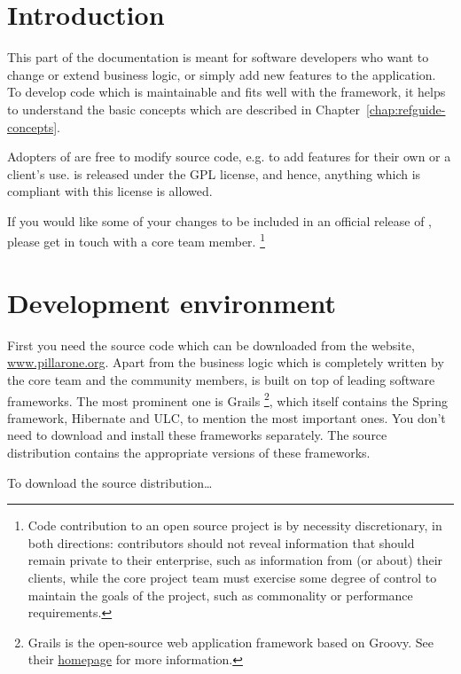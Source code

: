 \chapter{Introduction}
\label{chap:devguide-introduction}

This part of the \RA{} documentation is meant for software developers who want to change or
extend business logic, or simply add new features to the \RA{} application. To develop code
which is maintainable and fits well with the \PO{} framework, it helps to understand the
basic concepts which are described in Chapter~\ref{chap:refguide-concepts}.

Adopters of \RA{} are free to modify source code, e.g. to add features for their own or a
client's use. \RA{} is released under the GPL license, and hence, anything which is
compliant with this license is allowed.

If you would like some of your changes to be included in an official release of \RA{},
please get in touch with a core team member.%
\footnote{Code contribution to an open source project is by necessity discretionary, in
both directions: contributors should not reveal information that should remain private to
their enterprise, such as information from (or about) their clients, while the core
project team must exercise some degree of control to maintain the goals of the project,
such as commonality or performance requirements.}


\chapter{Development environment}
\label{chap:devEnvironment}

First you need the source code which can be downloaded from the \PO{} website,
\url{www.pillarone.org}.  Apart from the business logic which is completely written by the
core team and the community members, \RA{} is built on top of leading software frameworks.
The most prominent one is Grails%
	\footnote{Grails
		is the open-source web application framework based on Groovy.
		See their \href{http://grails.codehaus.org/}{homepage} for more information.},
which itself contains the Spring framework, Hibernate and ULC, to mention the most
important ones.  You don't need to download and install these frameworks separately.
The \RA{} source distribution contains the appropriate versions of these frameworks.

To download the source distribution\ldots

